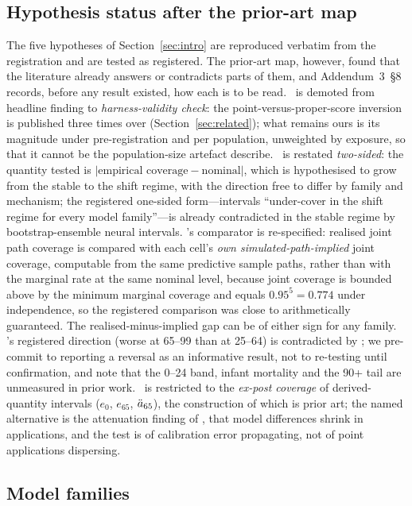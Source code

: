 \subsection{Hypothesis status after the prior-art map}
\label{sec:design-status}

The five hypotheses of Section~\ref{sec:intro} are reproduced verbatim from
the registration and are tested as registered. The prior-art map, however,
found that the literature already answers or contradicts parts of them, and
Addendum~3~\S8 records, before any result existed, how each is to be read.
\Hone\ is demoted from headline finding to \emph{harness-validity check}:
the point-versus-proper-score inversion is published three times over
(Section~\ref{sec:related}); what remains ours is its magnitude under
pre-registration and per population, unweighted by exposure, so that it
cannot be the population-size artefact \citet{schnurch2022point} describe.
\Htwo\ is restated \emph{two-sided}: the quantity tested is
$|\text{empirical coverage}-\text{nominal}|$, which is hypothesised to grow
from the stable to the shift regime, with the direction free to differ by
family and mechanism; the registered one-sided form---intervals
``under-cover in the shift regime for every model family''---is already
contradicted in the stable regime by bootstrap-ensemble neural intervals. \Hthree's comparator is re-specified: realised joint path
coverage is compared with each cell's \emph{own simulated-path-implied}
joint coverage, computable from the same predictive sample paths, rather
than with the marginal rate at the same nominal level, because joint
coverage is bounded above by the minimum marginal coverage and equals
$0.95^5=0.774$ under independence, so the registered comparison was close
to arithmetically guaranteed. The realised-minus-implied gap can be of
either sign for any family. \Hfour's registered direction (worse at 65--99
than at 25--64) is contradicted by \citet{dowd2010backtesting}; we
pre-commit to reporting a reversal as an informative result, not to
re-testing until confirmation, and note that the 0--24 band, infant
mortality and the 90+ tail are unmeasured in prior work. \Hfive\ is
restricted to the \emph{ex-post coverage} of derived-quantity intervals
($e_0$, $e_{65}$, $\ddot{a}_{65}$), the construction of which is prior art; the
named alternative is the attenuation finding of \citet{cairns2011mortality},
that model differences shrink in applications, and the test is of
calibration error propagating, not of point applications dispersing.

\subsection{Model families}
\label{sec:design-families}

